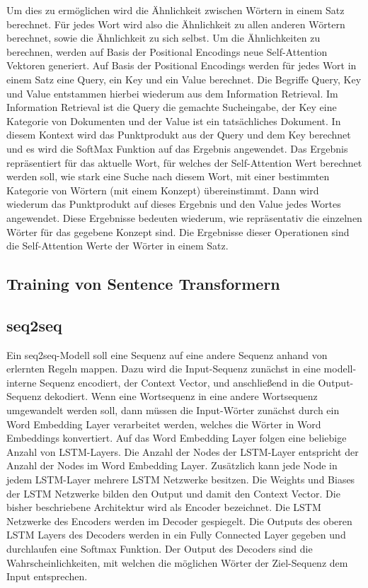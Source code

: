 Um dies zu ermöglichen wird die Ähnlichkeit zwischen Wörtern in einem Satz berechnet.
Für jedes Wort wird also die Ähnlichkeit zu allen anderen Wörtern berechnet, sowie die Ähnlichkeit zu sich selbst.
Um die Ähnlichkeiten zu berechnen, werden auf Basis der Positional Encodings neue Self-Attention Vektoren generiert.
Auf Basis der Positional Encodings werden für jedes Wort in einem Satz eine Query, ein Key und ein Value berechnet.
Die Begriffe Query, Key und Value entstammen hierbei wiederum aus dem Information Retrieval.
Im Information Retrieval ist die Query die gemachte Sucheingabe, der Key eine Kategorie von Dokumenten und der Value ist ein tatsächliches Dokument.
In diesem Kontext wird das Punktprodukt aus der Query und dem Key berechnet und es wird die SoftMax Funktion auf das Ergebnis angewendet.
Das Ergebnis repräsentiert für das aktuelle Wort, für welches der Self-Attention Wert berechnet werden soll, wie stark eine Suche nach diesem Wort, mit einer bestimmten Kategorie von Wörtern (mit einem Konzept) übereinstimmt.
Dann wird wiederum das Punktprodukt auf dieses Ergebnis und den Value jedes Wortes angewendet.
Diese Ergebnisse bedeuten wiederum, wie repräsentativ die einzelnen Wörter für das gegebene Konzept sind.
Die Ergebnisse dieser Operationen sind die Self-Attention Werte der Wörter in einem Satz.

\subsection{Training von Sentence Transformern}

\subsection{seq2seq}
Ein seq2seq-Modell soll eine Sequenz auf eine andere Sequenz anhand von erlernten Regeln mappen.
Dazu wird die Input-Sequenz zunächst in eine modell-interne Sequenz encodiert, der Context Vector, und anschließend in die Output-Sequenz dekodiert.
Wenn eine Wortsequenz in eine andere Wortsequenz umgewandelt werden soll, dann müssen die Input-Wörter zunächst durch ein Word Embedding Layer verarbeitet werden, welches die Wörter in Word Embeddings konvertiert.
Auf das Word Embedding Layer folgen eine beliebige Anzahl von LSTM-Layers.
Die Anzahl der Nodes der LSTM-Layer entspricht der Anzahl der Nodes im Word Embedding Layer.
Zusätzlich kann jede Node in jedem LSTM-Layer mehrere LSTM Netzwerke besitzen.
Die Weights und Biases der LSTM Netzwerke bilden den Output und damit den Context Vector.
Die bisher beschriebene Architektur wird als Encoder bezeichnet.
Die LSTM Netzwerke des Encoders werden im Decoder gespiegelt.
Die Outputs des oberen LSTM Layers des Decoders werden in ein Fully Connected Layer gegeben und durchlaufen eine Softmax Funktion.
Der Output des Decoders sind die Wahrscheinlichkeiten, mit welchen die möglichen Wörter der Ziel-Sequenz dem Input entsprechen. 


